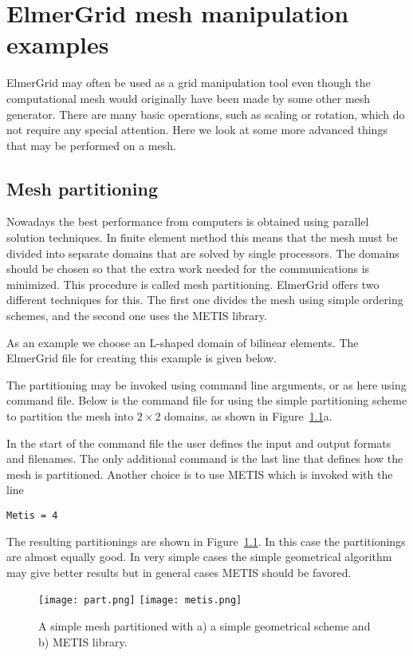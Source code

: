 \chapter{ElmerGrid mesh manipulation examples}

ElmerGrid may often be used as a grid manipulation
tool even though the computational mesh would 
originally have been made by some other mesh
generator. There are many basic 
operations, such as scaling or rotation, which do not 
require any special attention. Here we look at some more 
advanced things that may be performed on a mesh. 



\section{Mesh partitioning}

Nowadays the best performance from computers is obtained using
parallel solution techniques. In finite element method this
means that the mesh must be divided into separate domains 
that are solved by single processors. The domains should 
be chosen so that the extra work needed for the communications is
minimized. This procedure is called mesh partitioning. 
ElmerGrid offers two different techniques for this. 
The first one divides the mesh using simple ordering schemes,
 and the second one uses the METIS library. 

As an example we choose an L-shaped domain of bilinear elements.
The ElmerGrid file for creating this example is given below.


The partitioning may be invoked using command line arguments, or
as here using command file. Below is the command file
for using the simple partitioning scheme to partition the
mesh into $2 \times 2$ domains, as shown in Figure~\ref{fg:pic50}a. 
%

%
In the start of the command file the user defines the input and 
output formats and filenames. The only additional command is the 
last line that defines how the mesh is partitioned.
Another choice is to use METIS which is invoked with the line
\begin{verbatim}
Metis = 4
\end{verbatim}
The resulting partitionings are shown in Figure~\ref{fg:pic50}. In this case
the partitionings are almost equally good. In very simple
cases the simple geometrical algorithm may give better results
but in general cases METIS should be favored.
%
\begin{figure}[H]
\centering
\texttt{[image: part.png]}
\texttt{[image: metis.png]}
\caption{A simple mesh partitioned with a) a simple geometrical scheme and 
b) METIS library.}
\label{fg:pic50}
\end{figure}


